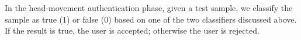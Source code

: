 In the head-movement authentication phase, given a test sample, we classify the sample as true (1) or false
(0) based on one of the two classifiers discussed above. If the result is true, the user is accepted; otherwise
the user is rejected.




